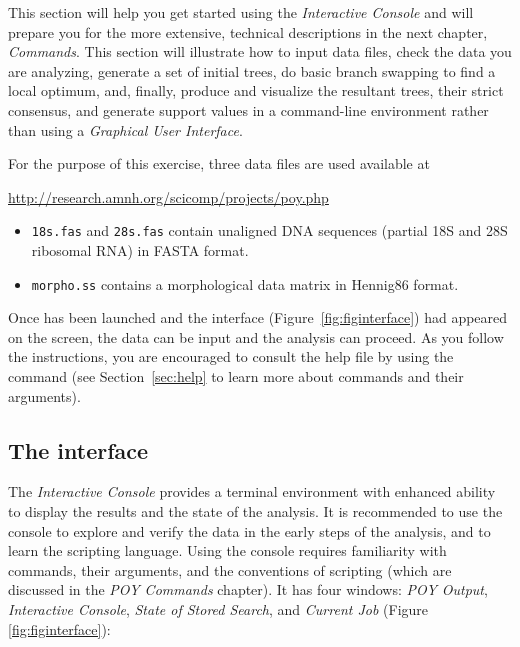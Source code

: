 {This section will help you get started using the \poy \emph{Interactive Console} and will prepare you for the
more extensive, technical descriptions in the next chapter, \emph{\poy Commands}. %
This section will illustrate how to input data files, check the data you are analyzing, generate a set of initial trees, do basic branch 
swapping to find a local optimum, and, finally, produce and visualize the resultant trees, their strict consensus, and generate support 
values in a command-line environment rather than using a \emph{Graphical User Interface}. 

For the purpose of this exercise, three data files are used available at \\
\begin{center}
\url{http://research.amnh.org/scicomp/projects/poy.php}
\end{center}

\begin{itemize}
	\item {\texttt{18s.fas} and \texttt{28s.fas} contain unaligned DNA sequences (partial 18S and 28S ribosomal RNA) 
	in FASTA format.~\cite{pearson1988}}
	\item {\texttt{morpho.ss} contains a morphological data matrix in Hennig86 format.~\cite{farris1988}}
\end{itemize}

Once \poy has been launched and the interface (Figure~\ref{fig:figinterface}) had appeared on the screen, the data can 
be input and the analysis can proceed. As you follow the instructions, you are encouraged to consult the help file by using 
the command  (see Section~\ref{sec:help} to learn more about \poy commands and their arguments).

\subsection{The interface}

The \emph{Interactive Console} provides a terminal environment with enhanced ability to display the results and the state 
of the analysis. It is recommended to use the console to explore and verify the data in the early steps of the analysis, and 
to learn the scripting language. Using the console requires familiarity with \poy commands, their arguments, and the 
conventions of \poy scripting (which are discussed in the \emph{POY Commands} chapter). It has four windows: 
\emph{POY Output}, \emph{Interactive Console}, \emph{State of Stored Search}, and \emph{Current Job} (Figure \ref{fig:figinterface}):

}
